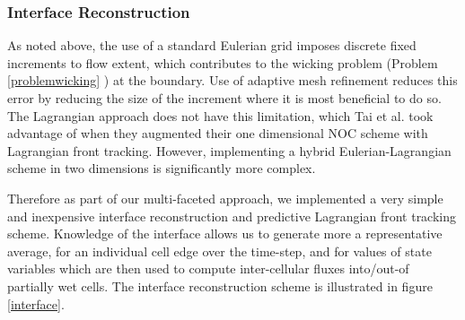 \documentclass[letterpaper,10pt]{article}
\begin{document}




\subsubsection{Interface Reconstruction} \label{Interfacerecon}
As noted above, the use of a standard Eulerian grid imposes discrete 
fixed increments to flow extent, which contributes to the wicking problem
(Problem \ref{problemwicking} ) at the 
boundary.  Use of adaptive mesh refinement 
reduces this error by reducing the size of the increment where it is
most beneficial to do so.  The Lagrangian approach does not have this 
limitation, which Tai et al. \cite{Tai2002} took advantage
of when they augmented their one dimensional NOC scheme with 
Lagrangian front tracking.  However, implementing a hybrid 
Eulerian-Lagrangian scheme in two dimensions is significantly more 
complex.  \newline

Therefore as part of our multi-faceted approach, we implemented a very 
simple and inexpensive interface reconstruction and predictive 
Lagrangian front tracking scheme.  Knowledge of the interface allows
us to generate more a representative average, for an individual cell edge 
over the time-step, and for values of state variables which are then used to 
compute inter-cellular fluxes into/out-of partially wet cells.  The 
interface reconstruction scheme is illustrated in figure \ref{interface}.\newline
\end{document}
